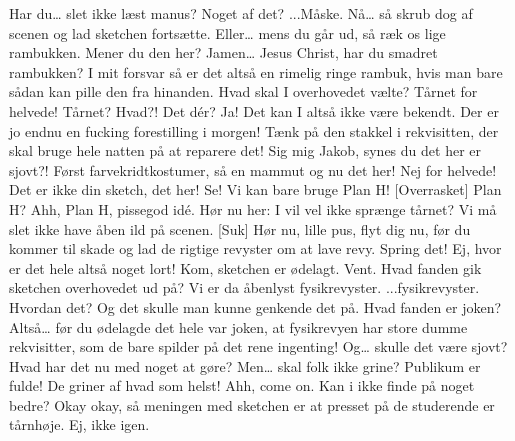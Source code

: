 \documentclass[a4paper,11pt]{article}
\begin{document}
\begin{sketch}
 Har du… slet ikke læst manus? Noget af det?
 ...Måske.
 Nå… så skrub dog af scenen og lad sketchen fortsætte. Eller… mens du går ud, så ræk os lige rambukken.
 Mener du den her?
 Jamen… Jesus Christ, har du smadret rambukken?
 I mit forsvar så er det altså en rimelig ringe rambuk, hvis man bare sådan kan pille den fra hinanden. Hvad skal I overhovedet vælte?
 Tårnet for helvede!
 Tårnet? Hvad?! Det dér?
 Ja!
 Det kan I altså ikke være bekendt. Der er jo endnu en fucking forestilling i morgen! Tænk på den stakkel i rekvisitten, der skal bruge hele natten på at reparere det!
 Sig mig Jakob, synes du det her er sjovt?! Først farvekridtkostumer, så en mammut og nu det her!
 Nej for helvede! Det er ikke din sketch, det her!
 Se! Vi kan bare bruge Plan H!
[Overrasket] Plan H?
 Ahh, Plan H, pissegod idé.
 Hør nu her: I vil vel ikke sprænge tårnet? Vi må slet ikke have åben ild på scenen.
[Suk] Hør nu, lille pus, flyt dig nu, før du kommer til skade og lad de rigtige revyster om at lave revy. Spring det!
 Ej, hvor er det hele altså noget lort! Kom, sketchen er ødelagt.
 Vent. Hvad fanden gik sketchen overhovedet ud på?
 Vi er da åbenlyst fysikrevyster.
 ...fysikrevyster. Hvordan det?
 Og det skulle man kunne genkende det på. Hvad fanden er joken?
 Altså… før du ødelagde det hele var joken, at fysikrevyen har store dumme rekvisitter, som de bare spilder på det rene ingenting!
 Og… skulle det være sjovt?
 Hvad har det nu med noget at gøre?
 Men… skal folk ikke grine?
 Publikum er fulde! De griner af hvad som helst!
 Ahh, come on. Kan i ikke finde på noget bedre?
 Okay okay,  så meningen med sketchen er at presset på de studerende er tårnhøje.
 Ej, ikke igen.
\end{sketch}
\end{document}
